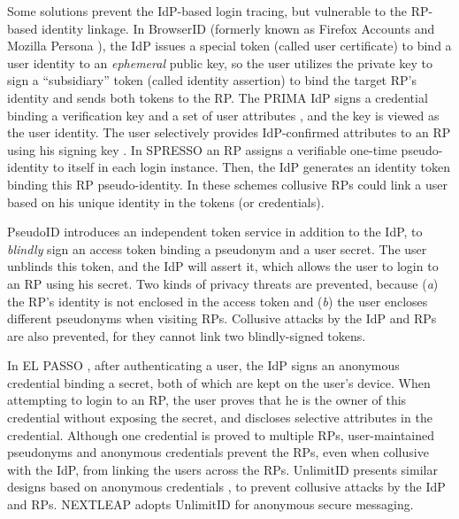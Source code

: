 Some solutions prevent the IdP-based login tracing,
    but vulnerable to the RP-based identity linkage.
In BrowserID \cite{BrowserID} (formerly known as Firefox Accounts \cite{FirefoxAccount} and Mozilla Persona \cite{persona}),
 the IdP %
  issues a special token (called user certificate) to bind a user identity to an \emph{ephemeral} public key,
 so the user utilizes the private key to sign a ``subsidiary'' token (called identity assertion)
    to bind the target RP's identity and sends both tokens to the RP.
The PRIMA IdP signs a credential binding a verification key and a set of user attributes \cite{prima}, and the key is viewed as the user identity.
The user selectively provides IdP-confirmed attributes to an RP using his signing key \cite{Oblivion}. %
In SPRESSO \cite{SPRESSO} an RP assigns a verifiable one-time pseudo-identity to itself in each login instance.
Then, the IdP generates an identity token binding this RP pseudo-identity. %
In these schemes \cite{BrowserID,prima,SPRESSO}
    collusive RPs could link a user based on his unique identity in the tokens (or credentials).


PseudoID \cite{PseudoID} introduces an independent token service in addition to the IdP,
    to  \emph{blindly} sign an access token binding a pseudonym and a user secret.
The user unblinds this token,
 and the IdP will assert it,
    which allows the user to login to an RP using his secret.
Two kinds of privacy threats are prevented, because (\emph{a}) the RP's identity is not enclosed in the access token
    and (\emph{b}) the user encloses different pseudonyms when visiting RPs.
Collusive attacks by the IdP and RPs are also prevented,
    for they cannot link two blindly-signed tokens.




In EL PASSO \cite{ELPASSO}, after authenticating a user,
    the IdP signs an anonymous credential \cite{anon-credential} binding a secret,
         both of which are kept on the user's device.
When attempting to login to an RP,
    the user proves that he is the owner of this credential without exposing the secret,
        and discloses selective attributes in the credential.
Although one credential is proved to multiple RPs,
        user-maintained pseudonyms and anonymous credentials prevent the RPs, even when collusive with the IdP, from linking the users across the RPs.
UnlimitID \cite{UnlimitID} presents similar designs based on anonymous credentials \cite{anon-credential},
        to prevent collusive attacks by the IdP and RPs.
NEXTLEAP \cite{nextleap} adopts UnlimitID for anonymous secure messaging.

